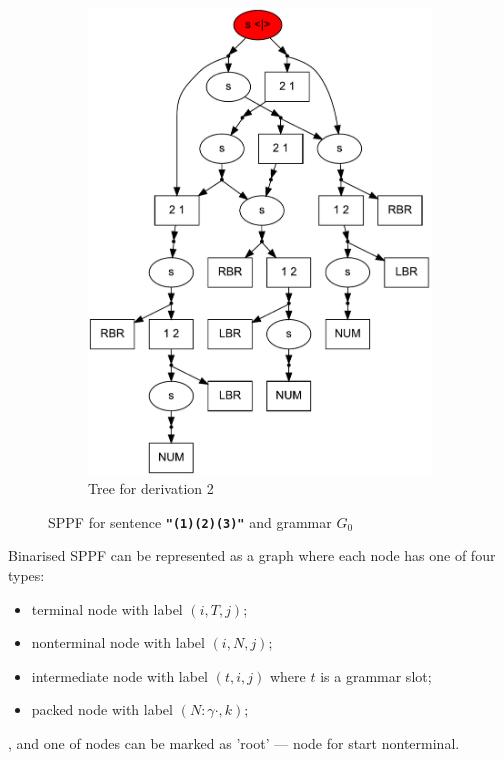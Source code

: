 \begin{figure}[ht]
\begin{center}
\begin{subfigure}[b]{0.3\textwidth}
        \includegraphics[width=\textwidth]{dot/Brackets.pdf}
        \caption{Tree for derivation 2}
        \label{tree2}        
    \end{subfigure}
    \caption{SPPF for sentence \textbf{\texttt{"(1)(2)(3)"}} and grammar $G_0$}
    \label{sppfSample}
    \end{center}                
\end{figure}

Binarised SPPF can be represented as a graph where each node has one of four types: 

\begin{itemize}
    \item terminal node with label $(i,T,j)$;
    \item nonterminal node with label $(i,N,j)$;
    \item intermediate node with label $(t,i,j)$ where $t$ is a grammar slot;
    \item packed node with label $(N : \gamma \cdot, k)$;
\end{itemize}
, and one of nodes can be marked as 'root' --- node for start nonterminal.

